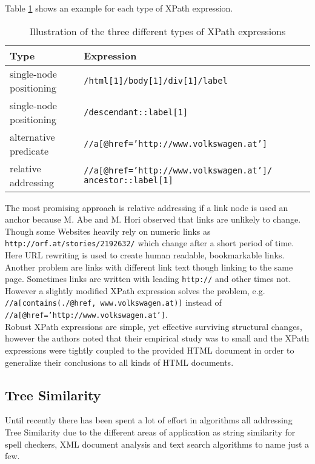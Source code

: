 \documentclass[12pt, notitlepage]{article}
\begin{document}
\vspace{1cm}
Table \ref{tab:xPath-expressions} shows an example for each type of XPath expression.
\begin{table}[H]
	\begin{tabularx}{\textwidth}{l|X}
		\textbf{Type} & \textbf{Expression} \\
		\hline
		single-node positioning & \texttt{/html[1]/body[1]/div[1]/label} \\
		single-node positioning & \texttt{/descendant::label[1]} \\
		alternative predicate & \texttt{//a[@href='http://www.volkswagen.at']} \\
		relative addressing & \texttt{//a[@href='http://www.volkswagen.at']/ ancestor::label[1]} \\
	\end{tabularx}
	\caption{Illustration of the three different types of XPath expressions}
	\label{tab:xPath-expressions}
\end{table}
The most promising approach is relative addressing if a link node is used an anchor because M. Abe and M. Hori observed that links are unlikely to change. 
Though some Websites heavily rely on numeric links as \texttt{http://orf.at/stories/2192632/} which change after a short period of time. Here URL rewriting 
is used to create human readable, bookmarkable links. Another problem are links with different link text though linking to the same page. Sometimes links are written with leading \texttt{http://} and other times not. However a slightly modified XPath expression solves the problem, e.g.
\texttt{//a[contains(./@href, www.volkswagen.at)]} instead of \texttt{//a[@href='http://www.volkswagen.at']}.\\
Robust XPath expressions are simple, yet effective surviving structural changes, however the authors noted that their empirical study was to small and the XPath expressions were tightly coupled to the provided HTML document in order to generalize their conclusions to all kinds of HTML documents.  
\subsection{Tree Similarity}
Until recently there has been spent a lot of effort in algorithms all addressing Tree Similarity due to the different areas of application as string similarity for spell checkers,
XML document analysis and text search algorithms to name just a few.
\end{document}
